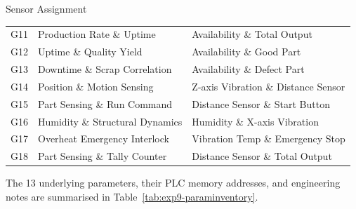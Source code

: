 \begin{labsection}{Sensor Assignment}{}
\begin{boxedtable}
{\begin{tabular}{p{1.1cm}p{5.2cm}p{7.6cm}}
        G11 & Production Rate \& Uptime       & Availability \& Total Output         \\
        G12 & Uptime \& Quality Yield         & Availability \& Good Part            \\
        G13 & Downtime \& Scrap Correlation   & Availability \& Defect Part          \\
        G14 & Position \& Motion Sensing      & Z-axis Vibration \& Distance Sensor  \\
        G15 & Part Sensing \& Run Command     & Distance Sensor \& Start Button      \\
        G16 & Humidity \& Structural Dynamics & Humidity \& X-axis Vibration         \\
        G17 & Overheat Emergency Interlock    & Vibration Temp \& Emergency Stop     \\
        G18 & Part Sensing \& Tally Counter   & Distance Sensor \& Total Output      \\
        \bottomrule
      \end{tabular}
    }
  \end{boxedtable}

  The 13 underlying parameters, their PLC memory addresses, and engineering notes are summarised in Table~\ref{tab:exp9-paraminventory}.


\end{labsection}
